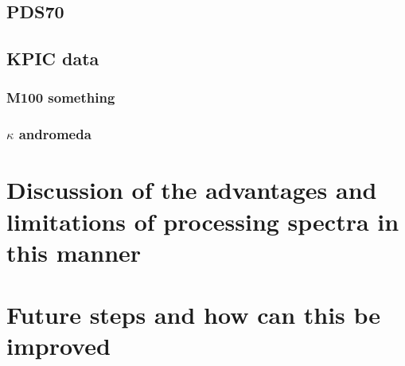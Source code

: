 \section{PDS70}
\section{KPIC data}
\subsection{M100 something}
\subsection{$\kappa$ andromeda}
\chapter{Discussion of the advantages and limitations of processing spectra in this manner}
\lipsum[1]

\chapter{Future steps and how can this be improved}
